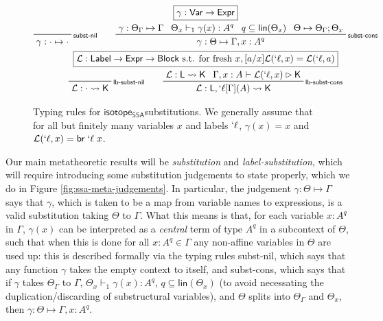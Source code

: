 \documentclass[acmsmall,screen,review]{acmart}
\newcommand{\mc}[1]{\ensuremath{\mathcal{#1}}}
\newcommand{\ms}[1]{\ensuremath{\mathsf{#1}}}
\newcommand{\lbl}[1]{{`#1}}
\newcommand{\brb}[2]{\ms{br}\;#1\;#2}
\newcommand{\lbrb}[2]{\brb{\lbl{#1}}{#2}}
\newcommand{\csplits}[3]{#1 \mapsto #2;#3}
\newcommand{\tlin}[2]{#2 \subseteq \ms{lin}(#1)}
\newcommand{\thyp}[3]{#1: {#2}^{#3}}
\newcommand{\lhyp}[3]{#1[#2](#3)}
\newcommand{\llhyp}[3]{\lhyp{\lbl{#1}}{#2}{#3}}
\newcommand{\rle}[1]{{\scriptsize\textsf{#1}}}
\newcommand{\hasty}[5]{#1 \vdash_{#2} #3: {#4}^{#5}}
\newcommand{\haslb}[3]{#1 \vdash #2 \rhd #3}
\newcommand{\issubst}[3]{#1: #2 \mapsto #3}
\newcommand{\lbsubst}[3]{#1: #2 \rightsquigarrow #3}
\newcommand{\isotopessa}{\ms{isotope_{SSA}}}
\begin{document}
\begin{figure}
  \begin{gather*}
    \boxed{\gamma: \ms{Var} \to \ms{Expr}}
    \\
    \prftree[r]{\rle{subst-nil}}
      {\issubst{\gamma}{\cdot}{\cdot}}
      \qquad
    \prftree[r]{\rle{subst-cons}}
      {\issubst{\gamma}{\Theta_\Gamma}{\Gamma}}
      {\hasty{\Theta_x}{1}{\gamma(x)}{A}{q}}
      {\tlin{\Theta_x}{q}}
      {\csplits{\Theta}{\Theta_\Gamma}{\Theta_x}}
      {\issubst{\gamma}{\Theta}{\Gamma, \thyp{x}{A}{q}}}
    \\
    \boxed{\mc{L}: \ms{Label} \to \ms{Expr} \to \ms{Block} \text{ s.t. for fresh } x, [a/x]\mc{L}(\lbl{\ell}, x) = \mc{L}(\lbl{\ell}, a)}
    \\
    \prftree[r]{\rle{lb-subst-nil}}
    {\lbsubst{\mc{L}}{\cdot}{\ms{K}}}
      \qquad
    \prftree[r]{\rle{lb-subst-cons}}
      {\lbsubst{\mc{L}}{\ms{L}}{\ms{K}}}
      {\haslb{\Gamma, \thyp{x}{A}{}}{\mc{L}(\lbl{\ell}, x)}{\ms{K}}}
      {\lbsubst{\mc{L}}{\ms{L}, \llhyp{\ell}{\Gamma}{A}}{\ms{K}}}
  \end{gather*}
  \caption{ Typing rules for \isotopessa substitutions. We generally assume that
    for all but finitely many variables \(x\) and labels \(\lbl{\ell}\),
    \(\gamma(x) = x\) and \(\mc{L}(\lbl{\ell}, x) = \lbrb{\ell}{x}\). }
  \label{fig:ssa-subst-typing}
\end{figure}

Our main metatheoretic results will be \textit{substitution} and
\textit{label-substitution}, which will require introducing some substitution
judgements to state properly, which we do in Figure
\ref{fig:ssa-meta-judgements}. In particular, the judgement
\(\issubst{\gamma}{\Theta}{\Gamma}\) says that \(\gamma\), which is taken to be
a map from variable names to expressions, is a valid substitution taking
\(\Theta\) to \(\Gamma\). What this means is that, for each variable
\(\thyp{x}{A}{q}\) in \(\Gamma\), \(\gamma(x)\) can be interpreted as a
\textit{central} term of type \(A^q\) in a subcontext of \(\Theta\), such that
when this is done for all \(\thyp{x}{A}{q} \in \Gamma\) any non-affine variables
in \(\Theta\) are used up: this is described formally via the typing rules
\rle{subst-nil}, which says that any function \(\gamma\) takes the empty context
to itself, and \rle{subst-cons}, which says that if \(\gamma\) takes
\(\Theta_\Gamma\) to \(\Gamma\), \(\hasty{\Theta_x}{1}{\gamma(x)}{A}{q}\), \(q
\subseteq \ms{lin}(\Theta_x)\) (to avoid necessating the duplication/discarding
of substructural variables), and \(\Theta\) splits into \(\Theta_\Gamma\) and
\(\Theta_x\), then \(\issubst{\gamma}{\Theta}{\Gamma, \thyp{x}{A}{q}}\).
\end{document}
